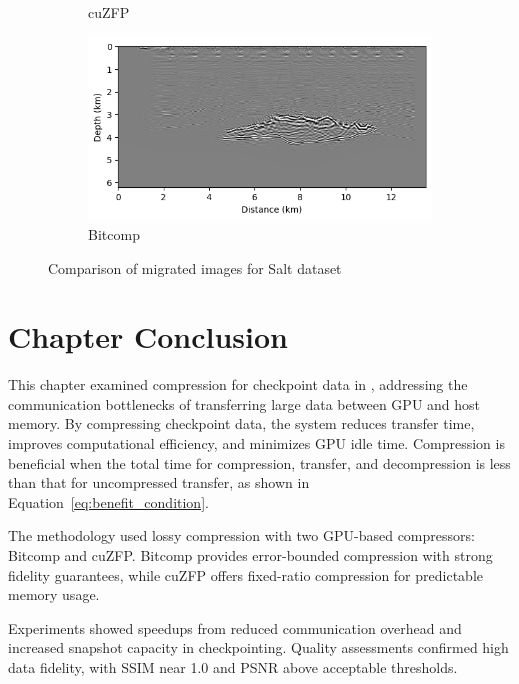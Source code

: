 \documentclass[Ingles,Final]{ic-tese-v3}
\begin{document}
\begin{figure}[]
\begin{subfigure}{0.49\textwidth}
        \caption{cuZFP}
        \label{fig:render_cuzfp_salt}
    \end{subfigure}
    \hfill
    \begin{subfigure}{0.49\textwidth}
        \includegraphics[width=\textwidth,trim={4px 0 0 0}, clip]{figures/quality/render_bitcomp_salt.png}
        \caption{Bitcomp}
        \label{fig:render_bitcomp_salt}%
    \end{subfigure}
    \hfill
    \caption[Comparison of migrated images for Salt dataset]{Comparison of migrated images for Salt dataset}
    \label{fig:quality}
\end{figure}

\section{Chapter Conclusion}

This chapter examined compression for checkpoint data in \awave, addressing the communication bottlenecks of transferring large data between GPU and host memory. By compressing checkpoint data, the system reduces transfer time, improves computational efficiency, and minimizes GPU idle time. Compression is beneficial when the total time for compression, transfer, and decompression is less than that for uncompressed transfer, as shown in Equation~\ref{eq:benefit_condition}.

The methodology used lossy compression with two GPU-based compressors: Bitcomp and cuZFP. Bitcomp provides error-bounded compression with strong fidelity guarantees, while cuZFP offers fixed-ratio compression for predictable memory usage.

Experiments showed speedups from reduced communication overhead and increased snapshot capacity in \uniform checkpointing. Quality assessments confirmed high data fidelity, with SSIM near 1.0 and PSNR above acceptable thresholds.
\end{document}
